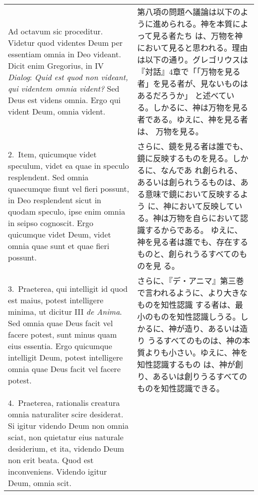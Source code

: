 \documentclass[10pt]{jsarticle} %
\begin{document}
\begin{longtable}{p{21em}p{21em}}

{\sc Ad octavum sic proceditur}. Videtur quod videntes Deum per
essentiam omnia in Deo videant. Dicit enim Gregorius, in IV {\it
Dialog}: {\it Quid est quod non videant, qui videntem omnia vident?}
Sed Deus est videns omnia. Ergo qui vident Deum, omnia vident.

&

第八項の問題へ議論は以下のように進められる。神を本質によって見る者たち
は、万物を神において見ると思われる。理由は以下の通り。グレゴリウスは
『対話』4章で「「万物を見る者」を見る者が、見ないものはあるだろうか」
と述べている。しかるに、神は万物を見る者である。ゆえに、神を見る者は、
万物を見る。

\\

2.~{\sc Item}, quicumque videt speculum, videt ea quae in speculo
resplendent. Sed omnia quaecumque fiunt vel fieri possunt, in Deo
resplendent sicut in quodam speculo, ipse enim omnia in seipso
cognoscit. Ergo quicumque videt Deum, videt omnia quae sunt et quae
fieri possunt.

&

さらに、鏡を見る者は誰でも、鏡に反映するものを見る。しかるに、なんであ
れ創られる、あるいは創られうるものは、ある意味で鏡において反映するよう
に、神において反映している。神は万物を自らにおいて認識するからである。
ゆえに、神を見る者は誰でも、存在するものと、創られうるすべてのものを見
る。

\\

3.~{\sc Praeterea}, qui intelligit id quod est maius, potest
intelligere minima, ut dicitur III {\it de Anima}. Sed omnia quae Deus
facit vel facere potest, sunt minus quam eius essentia. Ergo quicumque
intelligit Deum, potest intelligere omnia quae Deus facit vel facere
potest.

&

さらに、『デ・アニマ』第三巻で言われるように、より大きなものを知性認識
する者は、最小のものを知性認識しうる。しかるに、神が造り、あるいは造り
うるすべてのものは、神の本質よりも小さい。ゆえに、神を知性認識するもの
は、神が創り、あるいは創りうるすべてのものを知性認識できる。

\\

4.~{\sc Praeterea}, rationalis creatura omnia naturaliter scire
desiderat. Si igitur videndo Deum non omnia sciat, non quietatur eius
naturale desiderium, et ita, videndo Deum non erit beata. Quod est
inconveniens. Videndo igitur Deum, omnia scit.


\end{longtable}
\end{document}
